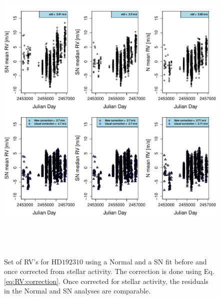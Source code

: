\documentclass{aa}
\begin{document}
\begin{figure} 
   \centering
\includegraphics[height = 6in]{NEW_CORRECTIONHD19231_[3]CorrectionActivity_RadialVelocity_vs_time.pdf} 
   \caption{Set of RV's for $\text{HD}192310$  using a Normal and a SN fit before and once corrected from stellar activity. The correction is done using Eq. \ref{eq:RV:correction}. Once corrected for stellar activity, the residuals in the Normal and SN analyses are comparable.}
   \label{fig:HD192310:correctionRV}
\end{figure}
\end{document}
